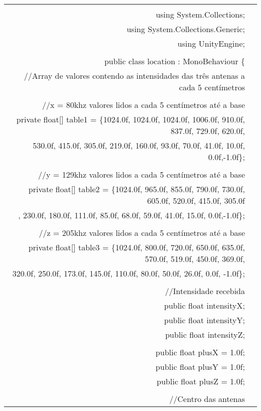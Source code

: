 \begin{longtable}{Rp{15cm}}
 \hline
\\
using System.Collections;
\\
using System.Collections.Generic;
\\
using UnityEngine;
\\
\\
public class location : MonoBehaviour \{
\\
\quad 	//Array de valores contendo as intensidades das três antenas a cada 5 centímetros
\\
\\
\quad  //x = 80khz valores lidos a cada 5 centímetros até a base
\\
\quad		private float[] table1 = \{1024.0f, 1024.0f, 1024.0f, 1006.0f, 910.0f, 837.0f, 729.0f, 620.0f, 
\\ \quad 530.0f, 415.0f, 305.0f, 219.0f, 160.0f, 93.0f, 70.0f, 41.0f, 10.0f, 0.0f,-1.0f\};
\\
\\
\quad //y = 129khz valores lidos a cada 5 centímetros até a base
\\
\quad	private float[] table2 = \{1024.0f, 965.0f, 855.0f, 790.0f, 730.0f, 605.0f, 520.0f, 415.0f, 305.0f
\\ \quad, 230.0f, 180.0f, 111.0f, 85.0f, 68.0f, 59.0f, 41.0f, 15.0f, 0.0f,-1.0f\}; 
\\
\\
\quad //z = 205khz valores lidos a cada 5 centímetros até a base
\\
\quad private float[] table3 = \{1024.0f, 800.0f, 720.0f, 650.0f, 635.0f, 570.0f, 519.0f, 450.0f, 369.0f,
\\ \quad 320.0f, 250.0f, 173.0f, 145.0f, 110.0f, 80.0f, 50.0f, 26.0f, 0.0f, -1.0f\}; 
\\
\\
\quad //Intensidade recebida
\\
\quad	public float intensityX;
\\
\quad	public float intensityY;
\\
\quad	public float intensityZ;
\\
\\
\quad	public float plusX = 1.0f;
\\    
\quad	public float plusY = 1.0f;
\\
\quad	public float plusZ = 1.0f;
\\
\\
\quad	//Centro das antenas

\end{longtable}
